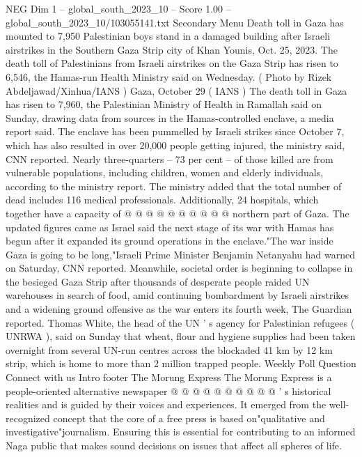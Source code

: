\begin{textsample}{NEG Dim 1 – global\_south\_2023\_10 – Score 1.00 – global\_south\_2023\_10/103055141.txt}  \label{ex:f1_neg_403}
Secondary Menu Death toll in Gaza has mounted to 7,950 Palestinian boys stand in a damaged building after Israeli airstrikes in the Southern Gaza Strip city of Khan Younis, Oct. 25, 2023.
The death toll of Palestinians from Israeli airstrikes on the Gaza Strip has risen to 6,546, the Hamas-run Health Ministry said on Wednesday. ( Photo by Rizek Abdeljawad/Xinhua/IANS ) Gaza, October 29 ( IANS ) The death toll in Gaza has risen to 7,960, the Palestinian Ministry of Health in Ramallah said on Sunday, drawing data from sources in the Hamas-controlled enclave, a media report said.
The enclave has been pummelled by Israeli strikes since October 7, which has also resulted in over 20,000 people getting injured, the ministry said, CNN reported.
Nearly three-quarters -- 73 per cent -- of those killed are from vulnerable populations, including children, women and elderly individuals, according to the ministry report.
The ministry added that the total number of dead includes 116 medical professionals.
Additionally, 24 hospitals, which together have a capacity of @ @ @ @ @ @ @ @ @ @ northern part of Gaza.
The updated figures came as Israel said the next stage of its war with Hamas has begun after it expanded its ground operations in the enclave."The war inside Gaza is going to be long,"Israeli Prime Minister Benjamin Netanyahu had warned on Saturday, CNN reported.
Meanwhile, societal order is beginning to collapse in the besieged Gaza Strip after thousands of desperate people raided UN warehouses in search of food, amid continuing bombardment by Israeli airstrikes and a widening ground offensive as the war enters its fourth week, The Guardian reported.
Thomas White, the head of the UN ' s agency for Palestinian refugees ( UNRWA ), said on Sunday that wheat, flour and hygiene supplies had been taken overnight from several UN-run centres across the blockaded 41 km by 12 km strip, which is home to more than 2 million trapped people.
Weekly Poll Question Connect with us Intro footer The Morung Express The Morung Express is a people-oriented alternative newspaper @ @ @ @ @ @ @ @ @ @ ' s historical realities and is guided by their voices and experiences.
It emerged from the well-recognized concept that the core of a free press is based on"qualitative and investigative"journalism.
Ensuring this is essential for contributing to an informed Naga public that makes sound decisions on issues that affect all spheres of life.

\end{textsample}
